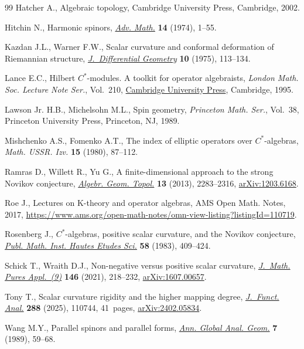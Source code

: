\documentclass[10pt,a4paper]{amsart}
\providecommand{\LastPageEnding}{}
\numberwithin{equation}{section}
\begin{document}
\begin{thebibliography}{99}
Hatcher A., Algebraic topology, Cambridge University Press, Cambridge, 2002.

Hitchin N., Harmonic spinors,
 \href{https://doi.org/10.1016/0001-8708(74)90021-8}{\textit{Adv. Math.}}
 \textbf{14} (1974), 1--55.

Kazdan J.L., Warner F.W., Scalar curvature and conformal deformation of
 {R}iemannian structure,
 \href{https://doi.org/10.4310/jdg/1214432678}{\textit{J.~Differential
 Geometry}} \textbf{10} (1975), 113--134.

Lance E.C., Hilbert {$C^*$}-modules. A toolkit for operator algebraists,
 \textit{London Math. Soc. Lecture Note Ser.}, Vol.~210,
 \href{https://doi.org/10.1017/CBO9780511526206}{Cambridge University Press},
 Cambridge, 1995.

Lawson Jr. H.B., Michelsohn M.L., Spin geometry, \textit{Princeton Math. Ser.},
 Vol.~38, Princeton University Press, Princeton, NJ, 1989.

Mishchenko A.S., Fomenko A.T., The index of elliptic operators over {$C^{\ast}
 $}-algebras, \textit{Math. USSR. Izv.} \textbf{15} (1980), 87--112.

Ramras D., Willett R., Yu G., A finite-dimensional approach to the strong
 {N}ovikov conjecture,
 \href{https://doi.org/10.2140/agt.2013.13.2283}{\textit{Algebr. Geom.
 Topol.}} \textbf{13} (2013), 2283--2316,
 \href{http://arxiv.org/abs/1203.6168}{arXiv:1203.6168}.

Roe J., Lectures on K-theory and operator algebras, {AMS} Open Math. Notes,
 2017,
 \url{https://www.ams.org/open-math-notes/omn-view-listing?listingId=110719}.

Rosenberg J., {$C^{\ast} $}-algebras, positive scalar curvature, and the
 {N}ovikov conjecture, \href{https://doi.org/10.1007/BF02953775}{\textit{Publ.
 Math. Inst. Hautes Etudes Sci.}} \textbf{58} (1983), 409--424.

Schick T., Wraith D.J., Non-negative versus positive scalar curvature,
 \href{https://doi.org/10.1016/j.matpur.2020.09.010}{\textit{J.~Math. Pures
 Appl.~(9)}} \textbf{146} (2021), 218--232,
 \href{http://arxiv.org/abs/1607.00657}{arXiv:1607.00657}.

Tony T., Scalar curvature rigidity and the higher mapping degree,
 \href{https://doi.org/10.1016/j.jfa.2024.110744}{\textit{J.~Funct. Anal.}}
 \textbf{288} (2025), 110744, 41~pages,
 \href{http://arxiv.org/abs/2402.05834}{arXiv:2402.05834}.

Wang M.Y., Parallel spinors and parallel forms,
 \href{https://doi.org/10.1007/BF00137402}{\textit{Ann. Global Anal. Geom.}}
 \textbf{7} (1989), 59--68.

\end{thebibliography}\LastPageEnding
\end{document}

